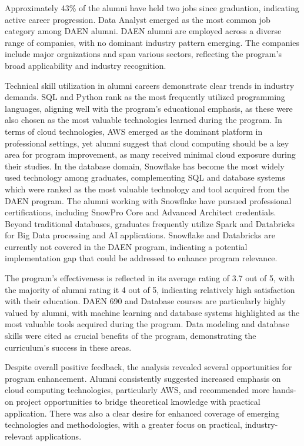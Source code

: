\documentclass[12pt,a4paper]{article}
\begin{document}
Approximately 43\% of the alumni have held two jobs since graduation, indicating active career progression. Data Analyst emerged as the most common job category among DAEN alumni. DAEN alumni are employed across a diverse range of companies, with no dominant industry pattern emerging. The companies include major orgnizations and span various sectors, reflecting the program's broad applicability and industry recognition.


Technical skill utilization in alumni careers demonstrate clear trends in industry demands. SQL and Python rank as the most frequently utilized programming languages, aligning well with the program's educational emphasis, as these were also chosen as the most valuable technologies learned during the program. In terms of cloud technologies, AWS emerged as the dominant platform in professional settings, yet alumni suggest that cloud computing should be a key area for program improvement, as many received minimal cloud exposure during their studies. In the database domain, Snowflake has become the most widely used technology among graduates, complementing SQL and database systems which were ranked as the most valuable technology and tool acquired from the DAEN program. The alumni working with Snowflake have pursued professional certifications, including SnowPro Core and Advanced Architect credentials. Beyond traditional databases, graduates frequently utilize Spark and Databricks for Big Data processing and AI applications. Snowflake and Databricks are currently not covered in the DAEN program, indicating a potential implementation gap that could be addressed to enhance program relevance.


The program's effectiveness is reflected in its average rating of 3.7 out of 5, with the majority of alumni rating it 4 out of 5, indicating relatively high satisfaction with their education. DAEN 690 and Database courses are particularly highly valued by alumni, with machine learning and database systems highlighted as the most valuable tools acquired during the program. Data modeling and database skills were cited as crucial benefits of the program, demonstrating the curriculum's success in these areas.


Despite overall positive feedback, the analysis revealed several opportunities for program enhancement. Alumni consistently suggested increased emphasis on cloud computing technologies, particularly AWS, and recommended more hands-on project opportunities to bridge theoretical knowledge with practical application. There was also a clear desire for enhanced coverage of emerging technologies and methodologies, with a greater focus on practical, industry-relevant applications.
\end{document}
